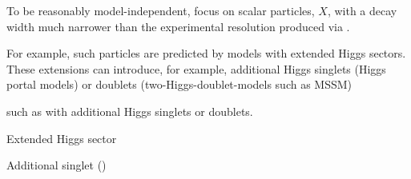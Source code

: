 To be reasonably model-independent, focus on scalar particles, $X$, with a decay
width much narrower than the experimental resolution produced via \ggF.

For example, such particles are predicted by models with extended Higgs
sectors. These extensions can introduce, for example, additional Higgs singlets
(Higgs portal models) or doublets (two-Higgs-doublet-models such as MSSM)


such as with additional Higgs singlets or doublets.

Extended Higgs sector

Additional singlet ()













